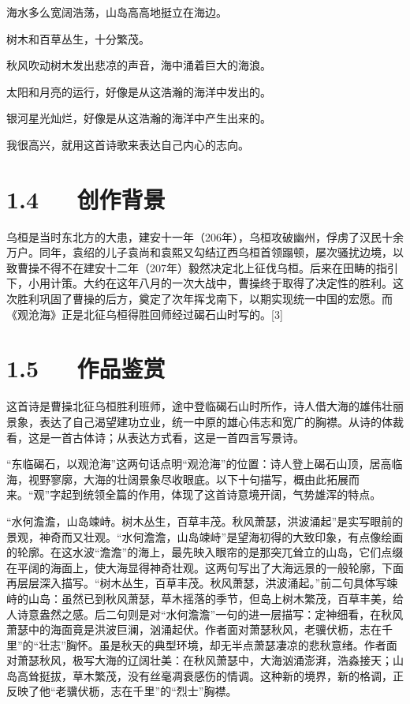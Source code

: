 \documentclass[letterpaper,12pt,english]{sphinxmanual}
\begin{document}
海水多么宽阔浩荡，山岛高高地挺立在海边。

树木和百草丛生，十分繁茂。

秋风吹动树木发出悲凉的声音，海中涌着巨大的海浪。

太阳和月亮的运行，好像是从这浩瀚的海洋中发出的。

银河星光灿烂，好像是从这浩瀚的海洋中产生出来的。

我很高兴，就用这首诗歌来表达自己内心的志向。


\section{1.4   创作背景}
\label{\detokenize{p01_u6563_u6587/_u66f9_u64cd-_u89c2_u6ca7_u6d77:id6}}
乌桓是当时东北方的大患，建安十一年（206年），乌桓攻破幽州，俘虏了汉民十余万户。同年，袁绍的儿子袁尚和袁熙又勾结辽西乌桓首领蹋顿，屡次骚扰边境，以致曹操不得不在建安十二年（207年）毅然决定北上征伐乌桓。后来在田畴的指引下，小用计策。大约在这年八月的一次大战中，曹操终于取得了决定性的胜利。这次胜利巩固了曹操的后方，奠定了次年挥戈南下，以期实现统一中国的宏愿。而《观沧海》正是北征乌桓得胜回师经过碣石山时写的。{[}3{]}


\section{1.5   作品鉴赏}
\label{\detokenize{p01_u6563_u6587/_u66f9_u64cd-_u89c2_u6ca7_u6d77:id7}}
这首诗是曹操北征乌桓胜利班师，途中登临碣石山时所作，诗人借大海的雄伟壮丽景象，表达了自己渴望建功立业，统一中原的雄心伟志和宽广的胸襟。从诗的体裁看，这是一首古体诗；从表达方式看，这是一首四言写景诗。

“东临碣石，以观沧海”这两句话点明“观沧海”的位置：诗人登上碣石山顶，居高临海，视野寥廓，大海的壮阔景象尽收眼底。以下十句描写，概由此拓展而来。“观”字起到统领全篇的作用，体现了这首诗意境开阔，气势雄浑的特点。

“水何澹澹，山岛竦峙。树木丛生，百草丰茂。秋风萧瑟，洪波涌起”是实写眼前的景观，神奇而又壮观。“水何澹澹，山岛竦峙”是望海初得的大致印象，有点像绘画的轮廓。在这水波“澹澹”的海上，最先映入眼帘的是那突兀耸立的山岛，它们点缀在平阔的海面上，使大海显得神奇壮观。这两句写出了大海远景的一般轮廓，下面再层层深入描写。“树木丛生，百草丰茂。秋风萧瑟，洪波涌起。”前二句具体写竦峙的山岛：虽然已到秋风萧瑟，草木摇落的季节，但岛上树木繁茂，百草丰美，给人诗意盎然之感。后二句则是对“水何澹澹”一句的进一层描写：定神细看，在秋风萧瑟中的海面竟是洪波巨澜，汹涌起伏。作者面对萧瑟秋风，老骥伏枥，志在千里”的“壮志”胸怀。虽是秋天的典型环境，却无半点萧瑟凄凉的悲秋意绪。作者面对萧瑟秋风，极写大海的辽阔壮美：在秋风萧瑟中，大海汹涌澎湃，浩淼接天；山岛高耸挺拔，草木繁茂，没有丝毫凋衰感伤的情调。这种新的境界，新的格调，正反映了他“老骥伏枥，志在千里”的“烈士”胸襟。
\end{document}
